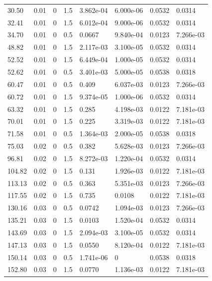 \documentclass[preview]{standalone}
\begin{document}
{{\begin{tabular}{L{1.2cm}C{1.2cm} C{0.3cm}C{0.5cm} C{1.4cm}C{1.4cm} C{1.4cm}C{1.4cm}}
  30.50  &  0.01  & 0     & 1.5 &  3.862e-04  & 6.000e-06  & 0.0532 &  0.0314   \\ 
  32.41  &  0.01  & 0     & 1.5 &  6.012e-04  & 9.000e-06  & 0.0532 &  0.0314   \\ 
  34.70  &  0.01  & 0     & 0.5 &  0.0667  & 9.840e-04  & 0.0123 &  7.266e-03   \\ 
  48.82  &  0.01  & 0     & 1.5 &  2.117e-03  & 3.100e-05  & 0.0532 &  0.0314   \\ 
  52.52  &  0.01  & 0     & 1.5 &  6.449e-04  & 1.000e-05  & 0.0532 &  0.0314   \\ 
  52.62  &  0.01  & 0     & 0.5 &  3.401e-03  & 5.000e-05  & 0.0538 &  0.0318   \\ 
  60.47  &  0.01  & 0     & 0.5 &  0.409  & 6.037e-03  & 0.0123 &  7.266e-03   \\ 
  60.72  &  0.01  & 0     & 1.5 &  9.374e-05  & 1.000e-06  & 0.0532 &  0.0314   \\ 
  63.32  &  0.01  & 0     & 1.5 &  0.285  & 4.198e-03  & 0.0122 &  7.181e-03   \\ 
  70.01  &  0.01  & 0     & 1.5 &  0.225  & 3.319e-03  & 0.0122 &  7.181e-03   \\ 
  71.58  &  0.01  & 0     & 0.5 &  1.364e-03  & 2.000e-05  & 0.0538 &  0.0318   \\ 
  75.03  &  0.02  & 0     & 0.5 &  0.382  & 5.628e-03  & 0.0123 &  7.266e-03   \\ 
  96.81  &  0.02  & 0     & 1.5 &  8.272e-03  & 1.220e-04  & 0.0532 &  0.0314   \\ 
  104.82  &  0.02  & 0     & 1.5 &  0.131  & 1.926e-03  & 0.0122 &  7.181e-03   \\ 
  113.13  &  0.02  & 0     & 0.5 &  0.363  & 5.351e-03  & 0.0123 &  7.266e-03   \\ 
  117.55  &  0.02  & 0     & 1.5 &  0.735  & 0.0108  & 0.0122 &  7.181e-03   \\ 
  130.16  &  0.03  & 0     & 0.5 &  0.0742  & 1.094e-03  & 0.0123 &  7.266e-03   \\ 
  135.21  &  0.03  & 0     & 1.5 &  0.0103  & 1.520e-04  & 0.0532 &  0.0314   \\ 
  143.69  &  0.03  & 0     & 1.5 &  2.094e-03  & 3.100e-05  & 0.0532 &  0.0314   \\ 
  147.13  &  0.03  & 0     & 1.5 &  0.0550  & 8.120e-04  & 0.0122 &  7.181e-03   \\ 
  150.14  &  0.03  & 0     & 0.5 &  1.741e-06  & 0  & 0.0538 &  0.0318   \\ 
  152.80  &  0.03  & 0     & 1.5 &  0.0770  & 1.136e-03  & 0.0122 &  7.181e-03   \\ 

\end{tabular}}}
\end{document}
